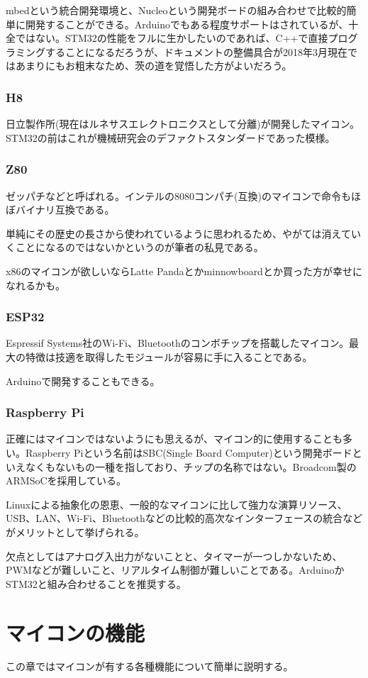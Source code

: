 \documentclass[a4paper,titlepage,here]{ujarticle}
\begin{document}
mbedという統合開発環境と、Nucleoという開発ボードの組み合わせで比較的簡単に開発することができる。Arduinoでもある程度サポートはされているが、十全ではない。STM32の性能をフルに生かしたいのであれば、C++で直接プログラミングすることになるだろうが、ドキュメントの整備具合が2018年3月現在ではあまりにもお粗末なため、茨の道を覚悟した方がよいだろう。
\subsubsection{H8}
日立製作所(現在はルネサスエレクトロニクスとして分離)が開発したマイコン。STM32の前はこれが機械研究会のデファクトスタンダードであった模様。
\subsubsection{Z80}
ゼッパチなどと呼ばれる。インテルの8080コンパチ(互換)のマイコンで命令もほぼバイナリ互換である。

単純にその歴史の長さから使われているように思われるため、やがては消えていくことになるのではないかというのが筆者の私見である。

x86のマイコンが欲しいならLatte Pandaとかminnowboardとか買った方が幸せになれるかも。
\subsubsection{ESP32}
Espressif Systems社のWi-Fi、Bluetoothのコンボチップを搭載したマイコン。最大の特徴は技適を取得したモジュールが容易に手に入ることである。

Arduinoで開発することもできる。
\subsubsection{Raspberry Pi}
正確にはマイコンではないようにも思えるが、マイコン的に使用することも多い。Raspberry Piという名前はSBC(Single Board Computer)という開発ボードといえなくもないもの一種を指しており、チップの名称ではない。Broadcom製のARMSoCを採用している。

Linuxによる抽象化の恩恵、一般的なマイコンに比して強力な演算リソース、USB、LAN、Wi-Fi、Bluetoothなどの比較的高次なインターフェースの統合などがメリットとして挙げられる。

欠点としてはアナログ入出力がないことと、タイマーが一つしかないため、PWMなどが難しいこと、リアルタイム制御が難しいことである。ArduinoかSTM32と組み合わせることを推奨する。
\section{マイコンの機能}
この章ではマイコンが有する各種機能について簡単に説明する。
\end{document}
